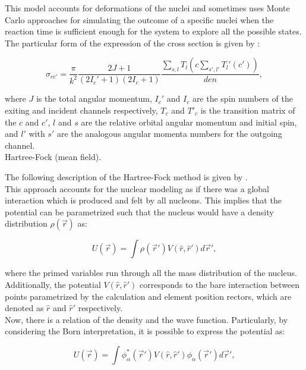 \documentclass[openany]{book}
\begin{document}
This model accounts for deformations of the nuclei and sometimes uses Monte Carlo approaches for simulating the outcome of a specific nuclei when the reaction time is sufficient enough for the system to explore all the possible states. \\


The particular form of the expression of the cross section is given by \cite{bertulani_2003}: 


\begin{equation} \label{eq:micro_hauserFeshbach}
	\sigma_{cc'} = \frac{\pi}{k^2}  \frac{2J+1}{(2I_c' + 1) (2 I_c + 1)} \frac{\sum_{s, l} T_l(c \sum_{s', l ' } {T_l'(c')} ) }{den},
\end{equation}

where $J$ is the total angular momentum, $I_c'$ and $I_c$ are the spin numbers of the exiting and incident channels respectively, $T_c$ and $T'_c$ is the transition matrix of the $c$ and $c'$, $l$ and $s$ are the relative orbital angular momentum and initial spin, and $l'$ with $s'$ are the analogous angular momenta numbers for the outgoing channel. \\


Hartree-Fock (mean field).

The following description of the Hartree-Fock method is given by \cite{heyde_2020}.\\ 

This approach accounts for the nuclear modeling as if there was a global interaction which is produced and felt by all nucleons. This implies that the potential can be parametrized such that the nucleus would have a density distribution $\rho(\vec r)$ as:

\begin{equation}\label{eq:micro_hartreeFock_potential}
	U(\vec r) = \int \rho (\vec r') V(\hat r, \hat r') d \vec r ',
\end{equation}

where the primed variables run through all the mass distribution of the nucleus. Additionally, the potential $V(\hat r, \hat r')$ corresponds to the bare interaction between points parametrized by the calculation and element position rectors, which are denoted as $\hat r$ and $\hat r'$ respectively. \\

Now, there is a relation of the density and the wave function. Particularly, by considering the Born interpretation, it is possible to express the potential as: 

\begin{equation}\label{eq:micro_hartreeFock_potential_waveFunction}
	U(\vec r) = \int \phi_\alpha^{*} (\vec r')  V(\hat r, \hat r') \phi_\alpha(\vec r') d \vec r ',
\end{equation}
\end{document}
